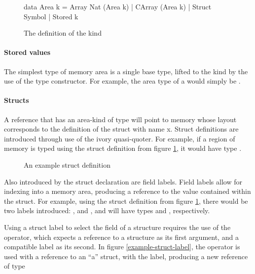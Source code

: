 \begin{figure}[h]
\begin{code}
data Area k = Array Nat (Area k)
            | CArray (Area k)
            | Struct Symbol
            | Stored k
\end{code}
\caption{The definition of the  kind}
\end{figure}

\paragraph{Stored values}
The simplest type of memory area is a single base type, lifted to the 
kind by the use of the  type constructor.  For example, the area type
of a  would simply be .

\paragraph{Structs} A reference that has an area-kind of type 
will point to memory whose layout corresponds to the definition of the struct
with name x.  Struct definitions are introduced through use of the ivory
quasi-quoter.  For example, if a region of memory is typed using the struct
definition from figure \ref{example-struct}, it would have type .

\begin{figure}[h]
\begin{code}
\end{code}
\caption{An example struct definition}
\label{example-struct}
\end{figure}

Also introduced by the struct declaration are field labels.  Field labels allow
for indexing into a memory area, producing a reference to the value contained
within the struct.  For example, using the struct definition from figure
\ref{example-struct}, there would be two labels introduced: , and
, and will have types  and , respectively.

Using a struct label to select the field of a structure requires the use of the
\cd{(\mytilde>)} operator, which expects a reference to a structure as its first
argument, and a compatible label as its second.  In figure
\ref{example-struct-label}, the \cd{(\mytilde>)} operator is used with a reference to
an ``a'' struct, with the  label, producing a new reference of type


